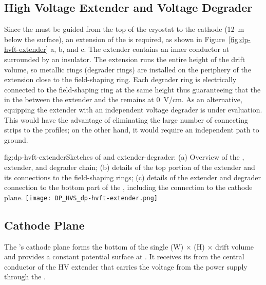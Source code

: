 \subsection{High Voltage Extender and Voltage Degrader}

Since the  must be guided from the top of the cryostat to the cathode (\SI{12}{\m} below the  surface), an extension of the  \fdth is required, as shown in Figure~\ref{fig:dp-hvft-extender} a, b, and c. The extender contains an inner conductor at \dptargetdriftvoltneg surrounded by an insulator. The extension runs the entire height of the drift volume, so metallic rings (degrader rings) are installed on the periphery of the extension close to the field-shaping ring. Each degrader ring is electrically connected to the field-shaping ring at the same height thus guaranteeing that the \efield in the \lar between the extender and the  remains at \SI{0}{V/cm}. As an alternative, equipping the extender with an independent voltage degrader is under evaluation. This would have the advantage of eliminating the large %
number of connecting strips to the  profiles; on the other hand,  it would  require an independent path to ground.


\begin{dunefigure}{fig:dp-hvft-extender}{Sketches of  \fdth and  extender-degrader: (a) Overview of the  \fdth,  extender, and degrader chain; (b) details of the top portion of the  extender and its connections to the field-shaping rings; (c) details of the  extender and degrader connection to the bottom part of the , including the connection to the cathode plane.}
\texttt{[image: DP\_HVS\_dp-hvft-extender.png]}
\end{dunefigure}


\subsection{Cathode Plane}
\label{sec:dp-hv-system-cathode}

The \dpmod{}'s cathode plane forms the  bottom of the single 
\dptpcwdth (W) $\times$ \tpcheight (H) $\times$ \dptpclen
drift volume and provides a constant potential surface at \dptargetdriftvoltneg{}.  It receives its  from the central conductor of the HV extender that carries the voltage from the power supply through the  \fdth.  

